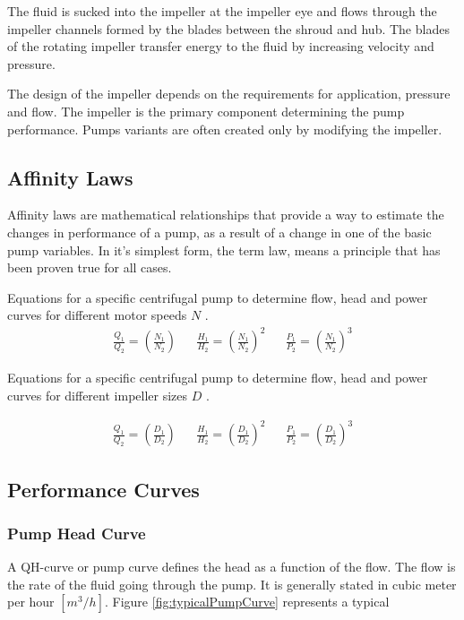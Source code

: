 The fluid is sucked into the impeller at the impeller eye and flows through
the impeller channels formed by the blades between the shroud and hub.
The blades of the rotating impeller transfer energy to the fluid by
increasing velocity and pressure.

The design of the impeller depends on the requirements for application,
pressure and flow. The impeller is the primary component determining the pump performance. 
Pumps variants are often created only by modifying the impeller.

\subsection{Affinity Laws}
Affinity laws are mathematical relationships that provide a way to estimate the 
changes in performance of a pump, as a result of a change in one of the basic pump variables.
In it's simplest form, the term law, means a principle that has been proven true for all cases.

Equations for a specific centrifugal pump to determine flow, head and power curves 
for different motor speeds $N$ \cite{Volk2014}.
\begin{align*}
	\frac{Q_1}{Q_2} = \left(\frac{N_1}{N_2}\right)   &&
	\frac{H_1}{H_2} = \left(\frac{N_1}{N_2}\right)^2 &&
	\frac{P_1}{P_2} = \left(\frac{N_1}{N_2}\right)^3	
\end{align*} 

Equations for a specific centrifugal pump to determine flow, head and power curves 
for different impeller sizes $D$ \cite{Volk2014}.

\begin{align*}
	\frac{Q_1}{Q_2} = \left(\frac{D_1}{D_2}\right)   &&
	\frac{H_1}{H_2} = \left(\frac{D_1}{D_2}\right)^2 &&
	\frac{P_1}{P_2} = \left(\frac{D_1}{D_2}\right)^3
\end{align*} 

\newpage
\subsection{Performance Curves}
\subsubsection{Pump Head Curve}
A QH-curve or pump curve defines the head as a function of the flow. 
The flow is the rate of the fluid going through the pump. It is generally stated in
cubic meter per hour $[m^{3}/h]$. Figure \ref{fig:typicalPumpCurve} represents a typical

